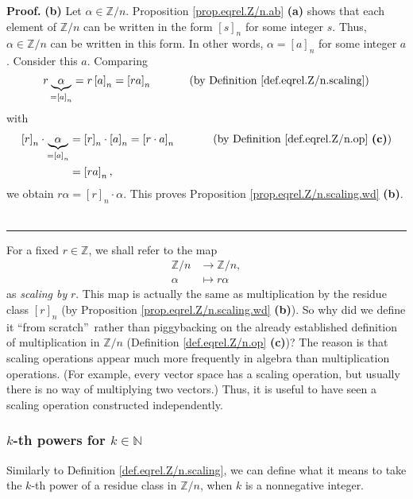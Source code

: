 \documentclass[numbers=enddot,12pt,final,onecolumn,notitlepage]{scrartcl}%
\numberwithin{exer}{subsection}
\theoremstyle{definition}
\newenvironment{proof}[1][Proof]{\noindent\textbf{#1.} }{\ \rule{0.5em}{0.5em}}
\begin{document}
\begin{proof}
\textbf{(b)} Let $\alpha\in\mathbb{Z}/n$. Proposition \ref{prop.eqrel.Z/n.ab}
\textbf{(a)} shows that each element of $\mathbb{Z}/n$ can be written in the
form $\left[  s\right]  _{n}$ for some integer $s$. Thus, $\alpha\in
\mathbb{Z}/n$ can be written in this form. In other words, $\alpha=\left[
a\right]  _{n}$ for some integer $a$. Consider this $a$. Comparing%
\[
r\underbrace{\alpha}_{=\left[  a\right]  _{n}}=r\left[  a\right]  _{n}=\left[
ra\right]  _{n}\ \ \ \ \ \ \ \ \ \ \left(  \text{by Definition
\ref{def.eqrel.Z/n.scaling}}\right)
\]
with%
\begin{align*}
\left[  r\right]  _{n}\cdot\underbrace{\alpha}_{=\left[  a\right]  _{n}}  &
=\left[  r\right]  _{n}\cdot\left[  a\right]  _{n}=\left[  r\cdot a\right]
_{n}\ \ \ \ \ \ \ \ \ \ \left(  \text{by Definition \ref{def.eqrel.Z/n.op}
\textbf{(c)}}\right) \\
&  =\left[  ra\right]  _{n},
\end{align*}
we obtain $r\alpha=\left[  r\right]  _{n}\cdot\alpha$. This proves Proposition
\ref{prop.eqrel.Z/n.scaling.wd} \textbf{(b)}.
\end{proof}

For a fixed $r\in\mathbb{Z}$, we shall refer to the map
\begin{align*}
\mathbb{Z}/n  &  \rightarrow\mathbb{Z}/n,\\
\alpha &  \mapsto r\alpha
\end{align*}
as \textit{scaling by }$r$. This map is actually the same as multiplication by
the residue class $\left[  r\right]  _{n}$ (by Proposition
\ref{prop.eqrel.Z/n.scaling.wd} \textbf{(b)}). So why did we define it
\textquotedblleft from scratch\textquotedblright\ rather than piggybacking on
the already established definition of multiplication in $\mathbb{Z}/n$
(Definition \ref{def.eqrel.Z/n.op} \textbf{(c)})? The reason is that scaling
operations appear much more frequently in algebra than multiplication
operations. (For example, every vector space has a scaling operation, but
usually there is no way of multiplying two vectors.) Thus, it is useful to
have seen a scaling operation constructed independently.

\subsubsection{$k$-th powers for $k\in\mathbb{N}$}

Similarly to Definition \ref{def.eqrel.Z/n.scaling}, we can define what it
means to take the $k$-th power of a residue class in $\mathbb{Z}/n$, when $k$
is a nonnegative integer.
\end{document}
